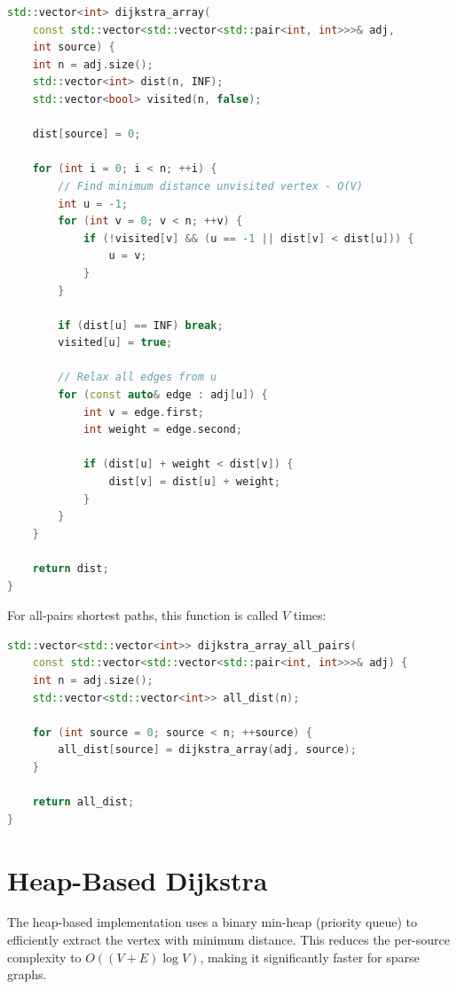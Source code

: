 \documentclass[12pt, a4paper]{report}
\begin{document}
\begin{lstlisting}[language=C++, caption={Array-based Dijkstra implementation}]
std::vector<int> dijkstra_array(
    const std::vector<std::vector<std::pair<int, int>>>& adj, 
    int source) {
    int n = adj.size();
    std::vector<int> dist(n, INF);
    std::vector<bool> visited(n, false);
    
    dist[source] = 0;
    
    for (int i = 0; i < n; ++i) {
        // Find minimum distance unvisited vertex - O(V)
        int u = -1;
        for (int v = 0; v < n; ++v) {
            if (!visited[v] && (u == -1 || dist[v] < dist[u])) {
                u = v;
            }
        }
        
        if (dist[u] == INF) break;
        visited[u] = true;
        
        // Relax all edges from u
        for (const auto& edge : adj[u]) {
            int v = edge.first;
            int weight = edge.second;
            
            if (dist[u] + weight < dist[v]) {
                dist[v] = dist[u] + weight;
            }
        }
    }
    
    return dist;
}
\end{lstlisting}

For all-pairs shortest paths, this function is called $V$ times:

\begin{lstlisting}[language=C++, caption={All-pairs Dijkstra using array implementation}]
std::vector<std::vector<int>> dijkstra_array_all_pairs(
    const std::vector<std::vector<std::pair<int, int>>>& adj) {
    int n = adj.size();
    std::vector<std::vector<int>> all_dist(n);
    
    for (int source = 0; source < n; ++source) {
        all_dist[source] = dijkstra_array(adj, source);
    }
    
    return all_dist;
}
\end{lstlisting}

\newpage

\section{Heap-Based Dijkstra}

The heap-based implementation uses a binary min-heap (priority queue) to efficiently extract the vertex with minimum distance. This reduces the per-source complexity to $O((V + E) \log V)$, making it significantly faster for sparse graphs.
\end{document}
